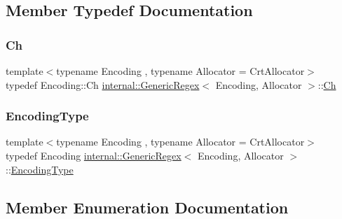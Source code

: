 \subsection{Member Typedef Documentation}
\mbox{\label{classinternal_1_1GenericRegex_a44e1a86ec27e1c5628a7d91c8c3daace}} 
\subsubsection{\texorpdfstring{Ch}{Ch}}
{\footnotesize\ttfamily template$<$typename Encoding , typename Allocator  = Crt\+Allocator$>$ \\
typedef Encoding\+::\+Ch \hyperlink{classinternal_1_1GenericRegex}{internal\+::\+Generic\+Regex}$<$ Encoding, Allocator $>$\+::\hyperlink{classinternal_1_1GenericRegex_a44e1a86ec27e1c5628a7d91c8c3daace}{Ch}}

\mbox{\label{classinternal_1_1GenericRegex_a8d0eb2f6a71868b2a8f03382b7836d30}} 
\subsubsection{\texorpdfstring{Encoding\+Type}{EncodingType}}
{\footnotesize\ttfamily template$<$typename Encoding , typename Allocator  = Crt\+Allocator$>$ \\
typedef Encoding \hyperlink{classinternal_1_1GenericRegex}{internal\+::\+Generic\+Regex}$<$ Encoding, Allocator $>$\+::\hyperlink{classinternal_1_1GenericRegex_a8d0eb2f6a71868b2a8f03382b7836d30}{Encoding\+Type}}



\subsection{Member Enumeration Documentation}
\mbox{\label{classinternal_1_1GenericRegex_acd9c0338546415c6d6dabdb76f8be673}} 
